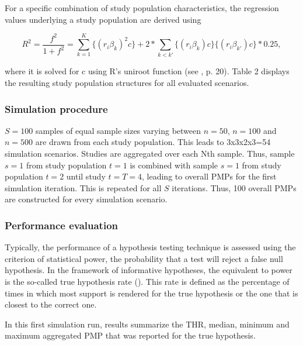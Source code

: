 \documentclass[11pt, a4paper]{article} %
\begin{document}
For a specific combination of study population characteristics, the regression values underlying a study population are derived using

\begin{equation}
R^2=\frac{f^2}{1+f^2}=\sum_{k=1}^{K}\{(r_i \beta_k)^2c\}+2*\sum_{k<k'} \{(r_i \beta_k)c \} \{(r_i \beta_{k'})c \} * 0.25,
\end{equation}

\noindent where it is solved for c using R's \textsf{uniroot} function (see \citet{Hoijtink2012}, p. 20). Table 2 displays the resulting study population structures for all evaluated scenarios. 


\subsubsection{Simulation procedure}
\noindent $S=100$ samples of equal sample sizes varying between $n=50$, $n=100$ and $n=500$ are drawn from each study population. This leads to 3x3x2x3=54 simulation scenarios. Studies are aggregated over each Nth sample. Thus, sample $s=1$ from study population $t=1$ is combined with sample $s=1$ from study population $t=2$ until study $t = T = 4$, leading to overall PMPs for the first simulation iteration. This is repeated for all $S$ iterations. Thus, 100 overall PMPs are constructed for every simulation scenario.

\subsubsection{Performance evaluation}
\noindent Typically, the performance of a hypothesis testing technique is assessed using the criterion of statistical power, the probability that a test will reject a false null hypothesis. In the framework of informative hypotheses, the equivalent to power is the so-called true hypothesis rate (\citet{Kuiper2015}). This rate is defined as the percentage of times in which most support is rendered for the true hypothesis or the one that is closest to the correct one. 

In this first simulation run, results summarize the THR, median, minimum and maximum aggregated PMP that was reported for the true hypothesis.
\end{document}
